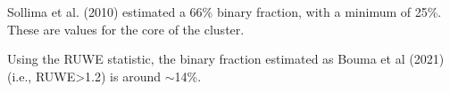 \documentclass[draft]{aa}
\begin{document}



    Sollima et al. (2010) estimated a 66\% binary fraction, with a minimum of
    25\%. These are values for the core of the cluster.

    Using the RUWE statistic, the binary fraction estimated as Bouma et al 
    (2021) (i.e., RUWE>1.2) is around $\sim$14\%.
\end{document}
